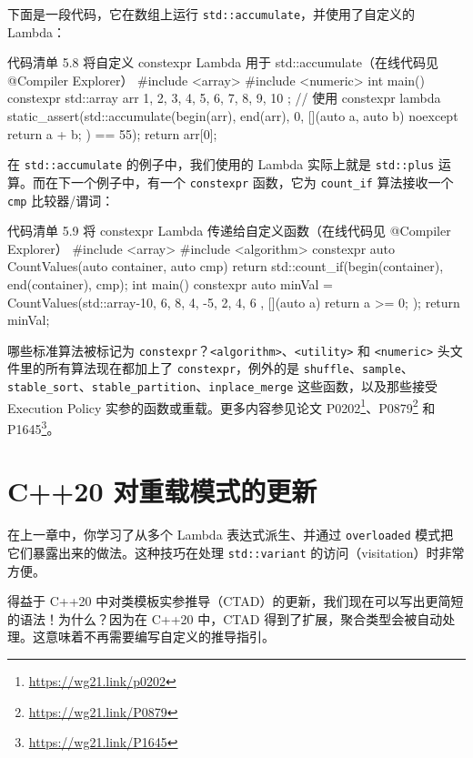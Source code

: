 下面是一段代码，它在数组上运行 \texttt{std::accumulate}，并使用了自定义的 Lambda：

\begin{codeboxt}{代码清单 5.8 将自定义 constexpr Lambda 用于 std::accumulate（在线代码见 @Compiler Explorer）}
#include <array>
#include <numeric>
int main() {
constexpr std::array arr{ 1, 2, 3, 4, 5, 6, 7, 8, 9, 10 };
// 使用 constexpr lambda
static_assert(std::accumulate(begin(arr), end(arr), 0,
[](auto a, auto b) noexcept {
return a + b;
}) == 55);
return arr[0];
}
\end{codeboxt}

在 \texttt{std::accumulate} 的例子中，我们使用的 Lambda 实际上就是 \texttt{std::plus} 运算。而在下一个例子中，有一个 \texttt{constexpr} 函数，它为 \texttt{count\_if} 算法接收一个 \texttt{cmp} 比较器/谓词：

\begin{codeboxt}{代码清单 5.9 将 constexpr Lambda 传递给自定义函数（在线代码见 @Compiler Explorer）}
#include <array>
#include <algorithm>
constexpr auto CountValues(auto container, auto cmp) {
return std::count_if(begin(container), end(container), cmp);
}
int main() {
constexpr auto minVal = CountValues(std::array{-10, 6, 8, 4, -5, 2, 4, 6 },
[](auto a) { return a >= 0; }
);
return minVal;
}
\end{codeboxt}


哪些标准算法被标记为 \texttt{constexpr}？\texttt{<algorithm>}、\texttt{<utility>} 和 \texttt{<numeric>} 头文件里的所有算法现在都加上了 \texttt{constexpr}，例外的是 \texttt{shuffle}、\texttt{sample}、\texttt{stable\_sort}、\texttt{stable\_partition}、\texttt{inplace\_merge} 这些函数，以及那些接受 Execution Policy 实参的函数或重载。更多内容参见论文 P0202\footnote{\url{https://wg21.link/p0202}}、P0879\footnote{\url{https://wg21.link/P0879}} 和 P1645\footnote{\url{https://wg21.link/P1645}}。

\section{C++20 对重载模式的更新}

在上一章中，你学习了从多个 Lambda 表达式派生、并通过 \texttt{overloaded} 模式把它们暴露出来的做法。这种技巧在处理 \texttt{std::variant} 的访问（visitation）时非常方便。

得益于 C++20 中对类模板实参推导（CTAD）的更新，我们现在可以写出更简短的语法！为什么？因为在 C++20 中，CTAD 得到了扩展，聚合类型会被自动处理。这意味着不再需要编写自定义的推导指引。

